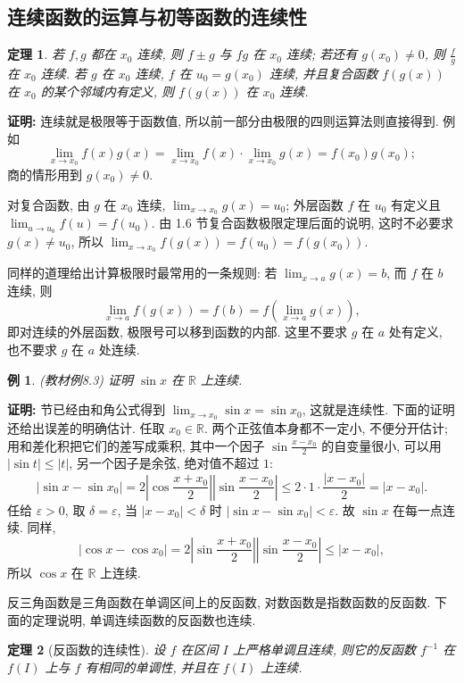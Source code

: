 \documentclass[UTF8,openany]{ctexbook}
\theoremstyle{chinesetextbook}
\newtheorem{example}{例}[section]
\newtheorem{theorem}{定理}[section]
\newenvironment{cnproof}{\par\indent\textbf{证明:} \ignorespaces}{\par}
\begin{document}
\subsection{连续函数的运算与初等函数的连续性}
\begin{theorem}
若 $f,g$ 都在 $x_0$ 连续, 则 $f\pm g$ 与 $fg$ 在 $x_0$ 连续; 若还有 $g(x_0)\ne0$, 则 $\displaystyle\frac fg$ 在 $x_0$ 连续. 若 $g$ 在 $x_0$ 连续, $f$ 在 $u_0=g(x_0)$ 连续, 并且复合函数 $f(g(x))$ 在 $x_0$ 的某个邻域内有定义, 则 $f(g(x))$ 在 $x_0$ 连续.
\end{theorem}
\begin{cnproof}
连续就是极限等于函数值, 所以前一部分由极限的四则运算法则直接得到. 例如
\[
\lim_{x\to x_0}f(x)g(x)=\lim_{x\to x_0}f(x)\cdot\lim_{x\to x_0}g(x)=f(x_0)g(x_0);
\]
商的情形用到 $g(x_0)\ne0$.

对复合函数, 由 $g$ 在 $x_0$ 连续, $\displaystyle\lim_{x\to x_0}g(x)=u_0$; 外层函数 $f$ 在 $u_0$ 有定义且 $\displaystyle\lim_{u\to u_0}f(u)=f(u_0)$. 由 1.6 节复合函数极限定理后面的说明, 这时不必要求 $g(x)\ne u_0$, 所以 $\displaystyle\lim_{x\to x_0}f(g(x))=f(u_0)=f(g(x_0))$.
\end{cnproof}
同样的道理给出计算极限时最常用的一条规则: 若 $\displaystyle\lim_{x\to a}g(x)=b$, 而 $f$ 在 $b$ 连续, 则
\[
\lim_{x\to a}f(g(x))=f(b)=f\left(\lim_{x\to a}g(x)\right),
\]
即对连续的外层函数, 极限号可以移到函数的内部. 这里不要求 $g$ 在 $a$ 处有定义, 也不要求 $g$ 在 $a$ 处连续.
\begin{example}
\textnormal{(教材例8.3)} 证明 $\sin x$ 在 $\mathbb R$ 上连续.
\end{example}
\begin{cnproof}
1.6 节已经由和角公式得到 $\displaystyle\lim_{x\to x_0}\sin x=\sin x_0$, 这就是连续性. 下面的证明还给出误差的明确估计. 任取 $x_0\in\mathbb R$. 两个正弦值本身都不一定小, 不便分开估计; 用和差化积把它们的差写成乘积, 其中一个因子 $\displaystyle\sin\frac{x-x_0}2$ 的自变量很小, 可以用 $|\sin t|\le|t|$, 另一个因子是余弦, 绝对值不超过 $1$:
\[
|\sin x-\sin x_0|=2\left|\cos\frac{x+x_0}2\right|\left|\sin\frac{x-x_0}2\right|\le2\cdot1\cdot\frac{|x-x_0|}2=|x-x_0|.
\]
任给 $\varepsilon>0$, 取 $\delta=\varepsilon$, 当 $|x-x_0|<\delta$ 时 $|\sin x-\sin x_0|<\varepsilon$. 故 $\sin x$ 在每一点连续. 同样,
\[
|\cos x-\cos x_0|=2\left|\sin\frac{x+x_0}2\right|\left|\sin\frac{x-x_0}2\right|\le|x-x_0|,
\]
所以 $\cos x$ 在 $\mathbb R$ 上连续.
\end{cnproof}
反三角函数是三角函数在单调区间上的反函数, 对数函数是指数函数的反函数. 下面的定理说明, 单调连续函数的反函数也连续.
\begin{theorem}[反函数的连续性]
设 $f$ 在区间 $I$ 上严格单调且连续, 则它的反函数 $f^{-1}$ 在 $f(I)$ 上与 $f$ 有相同的单调性, 并且在 $f(I)$ 上连续.
\end{theorem}
\end{document}
